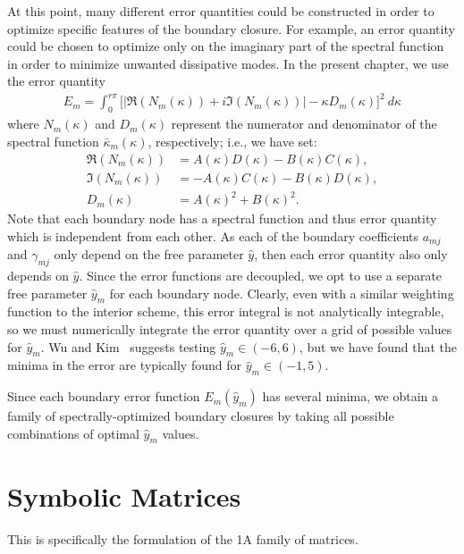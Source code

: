 At this point, many different error quantities could be constructed in order to optimize specific features of the boundary closure. For example, an error quantity could be chosen to optimize only on the imaginary part of the spectral function in order to minimize unwanted dissipative modes. In the present chapter, we use the error quantity  
\begin{align}
    E_m = \int_{0}^{r \pi}{\Big[ \big| \Re(N_m(\kappa)) + i \Im(N_m(\kappa)) \big| - \kappa D_m(\kappa) \Big]^2 \ d\kappa}
\end{align}
where $N_m(\kappa)$ and $D_m(\kappa)$ represent the numerator and denominator of the spectral function $\bar{\kappa}_m(\kappa)$, respectively; i.e., we have set:
\begin{align}
    \Re(N_m(\kappa)) &= A(\kappa) D(\kappa) - B(\kappa) C(\kappa),\\
    \Im(N_m(\kappa)) &= -A(\kappa) C(\kappa) - B(\kappa) D(\kappa),\\
    D_m(\kappa) &= A(\kappa)^2 + B(\kappa)^2.
\end{align}
Note that each boundary node has a spectral function and thus error quantity which is independent from each other. As each of the boundary coefficients $a_{mj}$ and $\gamma_{mj}$ only depend on the free parameter $\hat{y}$, then each error quantity also only depends on $\hat{y}$. Since the error functions are decoupled, we opt to use a separate free parameter $\hat{y}_m$ for each boundary node. Clearly, even with a similar weighting function to the interior scheme, this error integral is not analytically integrable, so we must numerically integrate the error quantity over a grid of possible values for $\hat{y}_m$. Wu and Kim~\cite{WuKim2024} suggests testing $\hat{y}_m \in (-6,6)$, but we have found that the minima in the error are typically found for $\hat{y}_m \in (-1,5)$.

Since each boundary error function $E_m(\hat{y}_m)$ has several minima, we obtain a family of spectrally-optimized boundary closures by taking all possible combinations of optimal $\hat{y}_m$ values.

\section*{Symbolic Matrices}
This is specifically the formulation of the 1A family of matrices.

